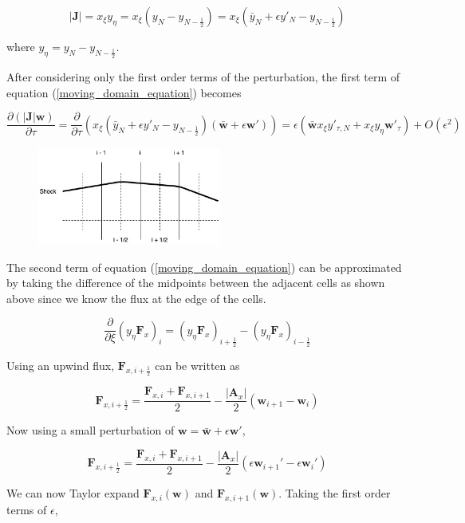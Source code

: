 \documentclass[10pt]{article}
\begin{document}
	$$ |\mathbf{J}| = x_\xi y_\eta = x_\xi (y_N - y_{N-\frac{1}{2}}) = x_\xi (\bar{y}_N + \epsilon y'_N - y_{N-\frac{1}{2}}) $$
	
	where $y_\eta = y_N - y_{N-\frac{1}{2}}$.
	
	After considering only the first order terms of the perturbation, the first term of equation (\ref{moving_domain_equation}) becomes
	
	\begin{equation} \label{moving_domain_equation_term1}
		\frac{\partial (|\mathbf{J}| \mathbf{w})}{\partial \tau} = \frac{\partial}{\partial \tau} (x_\xi (\bar{y}_N + \epsilon y'_N - y_{N-\frac{1}{2}}) (\bar{\mathbf{w}} + \epsilon \mathbf{w}')) = \epsilon \left( \bar{\mathbf{w}} x_\xi y'_{\tau,N} + x_\xi y_\eta  \mathbf{w}'_{\tau} \right) + O(\epsilon^2)
	\end{equation}
	
	\begin{figure}[h]
		\includegraphics[width=6cm]{shock_point_x}
		\centering
	\end{figure}
	
	The second term of equation (\ref{moving_domain_equation}) can be approximated by taking the difference of the midpoints between the adjacent cells as shown above since we know the flux at the edge of the cells.
	
	$$ \frac{\partial}{\partial \xi} (y_\eta \mathbf{F}_x)_i =  (y_\eta \mathbf{F}_x)_{i+\frac{1}{2}} - (y_\eta \mathbf{F}_x)_{i-\frac{1}{2}} $$
	
	Using an upwind flux, $\mathbf{F}_{x,i+\frac{1}{2}}$ can be written as
	
	$$ \mathbf{F}_{x,i+\frac{1}{2}} = \frac{\mathbf{F}_{x,i} + \mathbf{F}_{x,i+1}}{2} - \frac{|\mathbf{A}_x|}{2}(\mathbf{w}_{i+1} - \mathbf{w}_{i})$$
	
	Now using a small perturbation of $\mathbf{w} = \bar{\mathbf{w}} + \epsilon \mathbf{w}'$, 
	
	$$ \mathbf{F}_{x,i+\frac{1}{2}} = \frac{\mathbf{F}_{x,i} + \mathbf{F}_{x,i+1}}{2} - \frac{|\mathbf{A}_x|}{2} (\epsilon \mathbf{w}_{i+1}' - \epsilon \mathbf{w}_i')$$
	
	We can now Taylor expand $\mathbf{F}_{x,i}(\mathbf{w})$ and $\mathbf{F}_{x,i+1}(\mathbf{w})$. Taking the first order terms of $\epsilon$,
	
\end{document}
